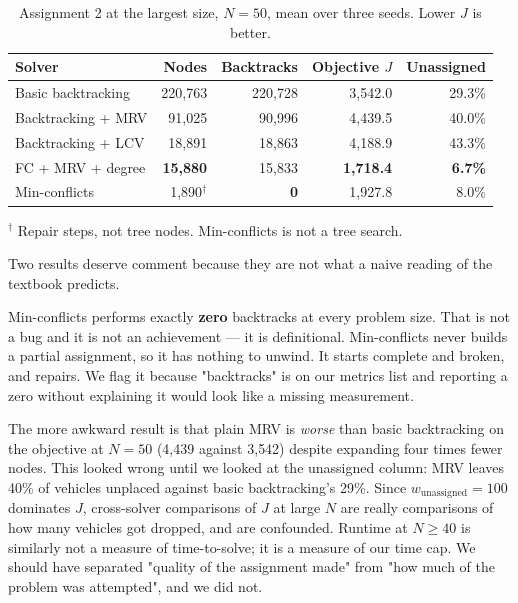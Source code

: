\documentclass{ai-lab-report}
\begin{document}
\begin{table}[H]
\centering
\caption{Assignment 2 at the largest size, $N = 50$, mean over three seeds. Lower $J$ is better.}
\label{tab:a2}
\begin{tabular}{lrrrr}
\toprule
Solver & Nodes & Backtracks & Objective $J$ & Unassigned \\
\midrule
Basic backtracking & 220{,}763 & 220{,}728 & 3{,}542.0 & 29.3\% \\
Backtracking + MRV & 91{,}025 & 90{,}996 & 4{,}439.5 & 40.0\% \\
Backtracking + LCV & 18{,}891 & 18{,}863 & 4{,}188.9 & 43.3\% \\
FC + MRV + degree  & \textbf{15{,}880} & 15{,}833 & \textbf{1{,}718.4} & \textbf{6.7\%} \\
Min-conflicts      & 1{,}890$^{\dagger}$ & \textbf{0} & 1{,}927.8 & 8.0\% \\
\bottomrule
\end{tabular}

\vspace{0.4em}
{\footnotesize $^{\dagger}$ Repair steps, not tree nodes. Min-conflicts is not a tree search.}
\end{table}

Two results deserve comment because they are not what a naive reading of the textbook
predicts.

Min-conflicts performs exactly \textbf{zero} backtracks at every problem size. That is not a
bug and it is not an achievement --- it is definitional. Min-conflicts never builds a partial
assignment, so it has nothing to unwind. It starts complete and broken, and repairs. We flag
it because "backtracks" is on our metrics list and reporting a zero without explaining it
would look like a missing measurement.

The more awkward result is that plain MRV is \emph{worse} than basic backtracking on the
objective at $N=50$ (4{,}439 against 3{,}542) despite expanding four times fewer nodes. This
looked wrong until we looked at the unassigned column: MRV leaves 40\% of vehicles unplaced
against basic backtracking's 29\%. Since $w_{\text{unassigned}} = 100$ dominates $J$,
cross-solver comparisons of $J$ at large $N$ are really comparisons of how many vehicles got
dropped, and are confounded. Runtime at $N \geq 40$ is similarly not a measure of
time-to-solve; it is a measure of our time cap. We should have separated "quality of the
assignment made" from "how much of the problem was attempted", and we did not.
\end{document}
